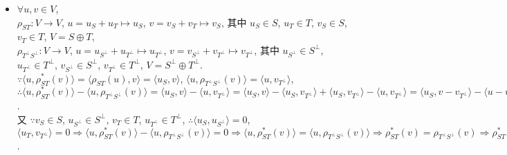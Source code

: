 \documentclass{note}
\begin{document}
\begin{pf}
\begin{itemize}
        $\forall v\in\im\tau^*$, $\exists w\in W$, s.t. $v=\tau^*(w)$.\\
        $\because\tau$ 为共轭同构, $\therefore\exists u\in V$, s.t. $w=\tau(u)\Longrightarrow v=\tau^*\tau(u)$, 故 $\im\tau^*\in\im\tau^*\tau$.

        综上, $\im\tau^*\tau=\im\tau^*$.

        同理, $\im\tau\tau^*=\im\tau$.
        \item[(4)] $\forall u,v\in V$,\\
        $\rho_{ST}:V\rightarrow V$, $u=u_S+u_T\mapsto u_S$, $v=v_S+v_T\mapsto v_S$, 其中 $u_S\in S$, $u_T\in T$, $v_S\in S$, $v_T\in T$, $V=S\oplus T$,\\
        $\rho_{T^{\perp}S^{\perp}}:V\rightarrow V$, $u=u_{S^{\perp}}+u_{T^{\perp}}\mapsto u_{T^{\perp}}$, $v=v_{S^{\perp}}+v_{T^{\perp}}\mapsto v_{T^{\perp}}$, 其中 $u_{S^{\perp}}\in S^{\perp}$, $u_{T^{\perp}}\in T^{\perp}$, $v_{S^{\perp}}\in S^{\perp}$, $v_{T^{\perp}}\in T^{\perp}$, $V=S^{\perp}\oplus T^{\perp}$.\\
        $\because\langle u,\rho_{ST}^*(v)\rangle=\langle\rho_{ST}(u),v\rangle=\langle u_S,v\rangle$, $\langle u,\rho_{T^{\perp}S^{\perp}}(v)\rangle=\langle u,v_{T^{\perp}}\rangle$,\\
        $\therefore\langle u,\rho_{ST}^*(v)\rangle-\langle u,\rho_{T^{\perp}S^{\perp}}(v)\rangle=\langle u_S,v\rangle-\langle u,v_{T^{\perp}}\rangle=\langle u_S,v\rangle-\langle u_S,v_{T^{\perp}}\rangle+\langle u_S,v_{T^{\perp}}\rangle-\langle u,v_{T^{\perp}}\rangle=\langle u_S,v-v_{T^{\perp}}\rangle-\langle u-u_S,v_{T^{\perp}}\rangle=\langle u_S,v_{S^{\perp}}\rangle-\langle u_T,v_{T^{\perp}}\rangle$.\\
        又 $\because v_S\in S$, $u_{S^{\perp}}\in S^{\perp}$, $v_T\in T$, $u_{T^{\perp}}\in T^{\perp}$, $\therefore\langle u_S,u_{S^{\perp}}\rangle=0$, $\langle u_T,v_{T^{\perp}}\rangle=0\Longrightarrow\langle u,\rho_{ST}^*(v)\rangle-\langle u,\rho_{T^{\perp}S^{\perp}}(v)\rangle=0\Longrightarrow\langle u,\rho_{ST}^*(v)\rangle=\langle u,\rho_{T^{\perp}S^{\perp}}(v)\rangle\Longrightarrow\rho_{ST}^*(v)=\rho_{T^{\perp}S^{\perp}}(v)\Longrightarrow\rho_{ST}^*=\rho_{T^{\perp}S^{\perp}}$.
    \end{itemize}
\end{pf}
\end{document}
